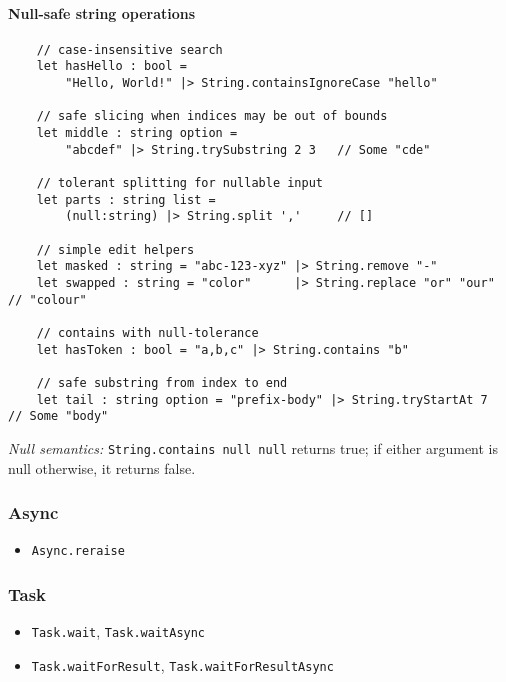 \documentclass{article}
\begin{document}
\paragraph{Null-safe string operations}
\begin{verbatim}
    // case-insensitive search
    let hasHello : bool =
        "Hello, World!" |> String.containsIgnoreCase "hello"

    // safe slicing when indices may be out of bounds
    let middle : string option =
        "abcdef" |> String.trySubstring 2 3   // Some "cde"

    // tolerant splitting for nullable input
    let parts : string list =
        (null:string) |> String.split ','     // []

    // simple edit helpers
    let masked : string = "abc-123-xyz" |> String.remove "-"
    let swapped : string = "color"      |> String.replace "or" "our"  // "colour"

    // contains with null-tolerance
    let hasToken : bool = "a,b,c" |> String.contains "b"

    // safe substring from index to end
    let tail : string option = "prefix-body" |> String.tryStartAt 7   // Some "body"
\end{verbatim}
\noindent \emph{Null semantics:} \texttt{String.contains null null} returns true; if either argument is null otherwise, it returns false.

\subsubsection{Async}

\begin{itemize}
\item \texttt{Async.reraise}
\end{itemize}

\subsubsection{Task}

\begin{itemize}
\item \texttt{Task.wait}, \texttt{Task.waitAsync}
\item \texttt{Task.waitForResult}, \texttt{Task.waitForResultAsync}
\end{itemize}
\end{document}
